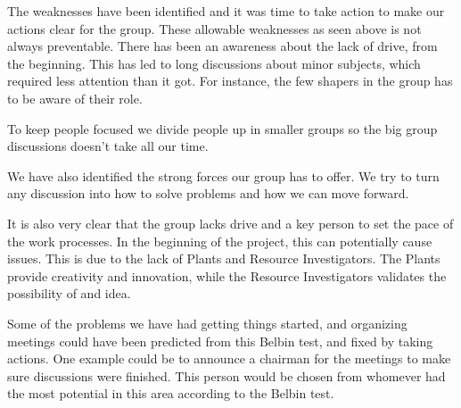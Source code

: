 The weaknesses have been identified and it was time to take action to make our actions clear for the group. 
These allowable weaknesses as seen above is not always preventable. 
There has been an awareness about the lack of drive, from the beginning. 
This has led to long discussions about minor subjects, which required less attention than it got. 
For instance, the few shapers in the group has to be aware of their role. 

To keep people focused we divide people up in smaller groups so the big group discussions doesn't take all our time.

We have also identified the strong forces our group has to offer.
We try to turn any discussion into how to solve problems and how we can move forward. 

It is also very clear that the group lacks drive and a key person to set the pace of the work processes. In the beginning of the project, this can potentially cause issues. This is due to the lack of Plants and Resource Investigators. The Plants provide creativity and innovation, while the Resource Investigators validates the possibility of and idea.

Some of the problems we have had getting things started, and organizing meetings could have been predicted from this Belbin test, and fixed by taking actions. One example could be to announce a chairman for the meetings to make sure discussions were finished. This person would be chosen from whomever had the most potential in this area according to the Belbin test.


 



